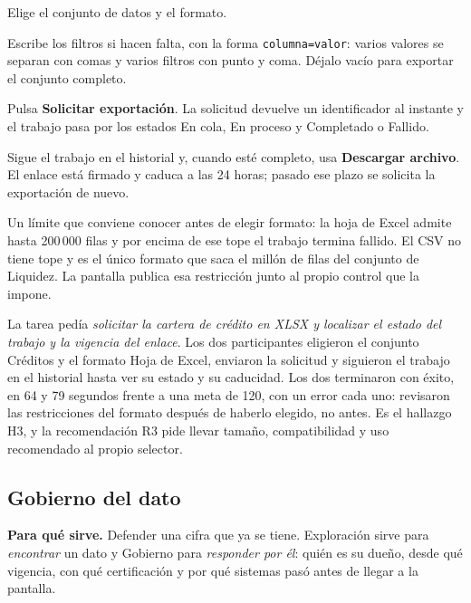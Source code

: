 \begin{uxpreg}
  \item Elige el conjunto de datos y el formato.
  \item Escribe los filtros si hacen falta, con la forma \texttt{columna=valor}: varios valores se
    separan con comas y varios filtros con punto y coma. Déjalo vacío para exportar el conjunto
    completo.
  \item Pulsa \textbf{Solicitar exportación}. La solicitud devuelve un identificador al instante y
    el trabajo pasa por los estados En cola, En proceso y Completado o Fallido.
  \item Sigue el trabajo en el historial y, cuando esté completo, usa \textbf{Descargar archivo}.
    El enlace está firmado y caduca a las 24 horas; pasado ese plazo se solicita la exportación de
    nuevo.
\end{uxpreg}

Un límite que conviene conocer antes de elegir formato: la hoja de Excel admite hasta 200\,000
filas y por encima de ese tope el trabajo termina fallido. El CSV no tiene tope y es el único
formato que saca el millón de filas del conjunto de Liquidez. La pantalla publica esa restricción
junto al propio control que la impone.

\begin{uxnota}
La tarea pedía \emph{solicitar la cartera de crédito en XLSX y localizar el estado del trabajo y la
vigencia del enlace}. Los dos participantes eligieron el conjunto Créditos y el formato Hoja de
Excel, enviaron la solicitud y siguieron el trabajo en el historial hasta ver su estado y su
caducidad. Los dos terminaron con éxito, en 64 y 79 segundos frente a una meta de 120, con un
error cada uno: revisaron las restricciones del formato después de haberlo elegido, no antes. Es
el hallazgo H3, y la recomendación R3 pide llevar tamaño, compatibilidad y uso recomendado al
propio selector.
\end{uxnota}

\clearpage
\subsection{Gobierno del dato}

\textbf{Para qué sirve.} Defender una cifra que ya se tiene. Exploración sirve para
\emph{encontrar} un dato y Gobierno para \emph{responder por él}: quién es su dueño, desde qué
vigencia, con qué certificación y por qué sistemas pasó antes de llegar a la pantalla.

